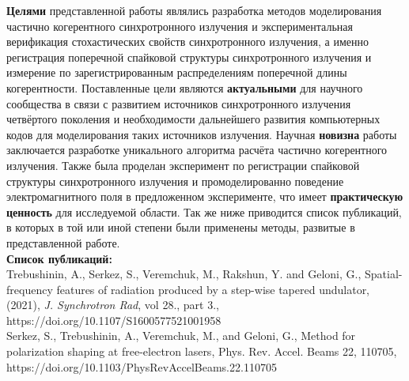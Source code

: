 \textbf{Целями} представленной работы являлись разработка методов моделирования частично когерентного синхротронного излучения и экспериментальная верификация стохастических свойств синхротронного излучения, а именно регистрация поперечной спайковой структуры синхротронного излучения и измерение по зарегистрированным распределениям поперечной длины когерентности. Поставленные цели являются \textbf{актуальными} для научного сообщества в связи с развитием источников синхротронного излучения четвёртого поколения и необходимости дальнейшего развития компьютерных кодов для моделирования таких источников излучения. Научная \textbf{новизна} работы заключается разработке уникального алгоритма расчёта частично когерентного излучения. Также была проделан эксперимент по регистрации спайковой структуры синхротронного излучения и промоделированно поведение электромагнитного поля в предложенном эксперименте, что имеет \textbf{практическую ценность} для исследуемой области. Так же ниже приводится список публикаций, в которых в той или иной степени были применены методы, развитые в представленной работе.\\

\noindent\textbf{Список публикаций:}
\\

\noindent Trebushinin, A., Serkez, S., Veremchuk, M., Rakshun, Y. and Geloni, G., 
Spatial-frequency features of radiation produced by a step-wise tapered undulator, (2021), \textit{J. Synchrotron Rad}, vol 28., part 3., https://doi.org/10.1107/S1600577521001958
\\

\noindent Serkez, S., Trebushinin, A., Veremchuk, M., and Geloni, G., Method for polarization shaping at free-electron lasers, Phys. Rev. Accel. Beams 22, 110705, https://doi.org/10.1103/PhysRevAccelBeams.22.110705




